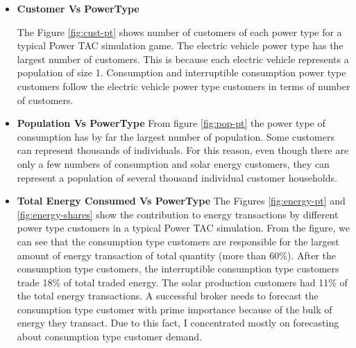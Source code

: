 \begin{itemize}
\item \textbf{Customer Vs PowerType}

The Figure \ref{fig:cust-pt} shows number of customers of each power type for a typical Power TAC simulation game. The electric vehicle power type has the largest number of customers. This is because each electric vehicle represents a population of size 1. Consumption and interruptible consumption power type customers follow the electric vehicle power type customers in terms of number of customers. 

\item \textbf{Population Vs PowerType}
From figure \ref{fig:pop-pt} the power type of consumption has by far the largest number of population. Some customers can represent thousands of individuals. For this reason, even though there are only a few numbers of consumption and solar energy customers, they can represent a population of several thousand individual customer households. 

\item \textbf{Total Energy Consumed Vs PowerType}
The Figures \ref{fig:energy-pt} and \ref{fig:energy-shares} show the contribution to energy transactions by different power type customers in a typical Power TAC simulation. From the figure, we can see that the consumption type customers are responsible for the largest amount of energy transaction of total quantity (more than 60\%). After the consumption type customers, the interruptible consumption type customers trade 18\% of total traded energy. The solar production customers had 11\% of the total energy transactions. A successful broker needs to forecast the consumption type customer with prime importance because of the bulk of energy they transact. Due to this fact, I concentrated mostly on forecasting about consumption type customer demand.



\end{itemize}
